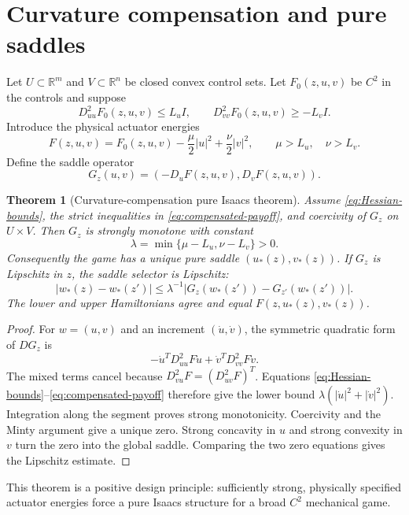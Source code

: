 \documentclass[11pt,reqno]{amsart}
\newtheorem{theorem}{Theorem}[section]
\theoremstyle{definition}
\theoremstyle{remark}
\newcommand{\R}{\mathbb R}
\newcommand{\abs}[1]{\left\lvert #1\right\rvert}
\begin{document}
\section{Curvature compensation and pure saddles}\label{sec:curvature}

Let $U\subset\R^m$ and $V\subset\R^n$ be closed convex control sets.  Let
$F_0(z,u,v)$ be $C^2$ in the controls and suppose
\begin{equation}\label{eq:Hessian-bounds}
 D_{uu}^2F_0(z,u,v)\le L_uI,
 \qquad
 D_{vv}^2F_0(z,u,v)\ge-L_vI.
\end{equation}
Introduce the physical actuator energies
\begin{equation}\label{eq:compensated-payoff}
 F(z,u,v)=F_0(z,u,v)-\frac\mu2\abs u^2+
 \frac\nu2\abs v^2,
 \qquad \mu>L_u,\quad\nu>L_v.
\end{equation}
Define the saddle operator
\[
 G_z(u,v)=(-D_uF(z,u,v),D_vF(z,u,v)).
\]

\begin{theorem}[Curvature-compensation pure Isaacs theorem]\label{thm:curvature}
Assume \eqref{eq:Hessian-bounds}, the strict inequalities in
\eqref{eq:compensated-payoff}, and coercivity of $G_z$ on $U\times V$.
Then $G_z$ is strongly monotone with constant
\[
 \lambda=\min\{\mu-L_u,\nu-L_v\}>0.
\]
Consequently the game has a unique pure saddle $(u_*(z),v_*(z))$.  If
$G_z$ is Lipschitz in $z$, the saddle selector is Lipschitz:
\[
 \abs{w_*(z)-w_*(z')}
 \le\lambda^{-1}
 \abs{G_z(w_*(z'))-G_{z'}(w_*(z'))}.
\]
The lower and upper Hamiltonians agree and equal
$F(z,u_*(z),v_*(z))$.
\end{theorem}

\begin{proof}
For $w=(u,v)$ and an increment $(\dot u,\dot v)$, the symmetric quadratic
form of $DG_z$ is
\[
 -\dot u^TD_{uu}^2F\dot u+
 \dot v^TD_{vv}^2F\dot v.
\]
The mixed terms cancel because
$D_{vu}^2F=(D_{uv}^2F)^T$.  Equations
\eqref{eq:Hessian-bounds}--\eqref{eq:compensated-payoff} therefore give the
lower bound $\lambda(\abs{\dot u}^2+\abs{\dot v}^2)$.  Integration along the
segment proves strong monotonicity.  Coercivity and the Minty argument give a
unique zero.  Strong concavity in $u$ and strong convexity in $v$ turn the zero
into the global saddle.  Comparing the two zero equations gives the Lipschitz
estimate.
\end{proof}

This theorem is a positive design principle: sufficiently strong, physically
specified actuator energies force a pure Isaacs structure for a broad $C^2$
mechanical game.
\end{document}

